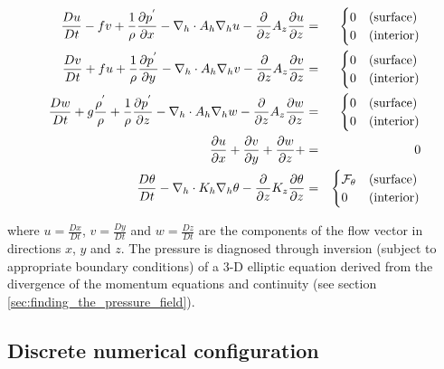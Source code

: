 \begin{eqnarray}
\label{EQ:eg-bconv-model_equations}
\frac{Du}{Dt} - fv + 
  \frac{1}{\rho}\frac{\partial p^{'}}{\partial x} - 
  \nabla_{h}\cdot A_{h}\nabla_{h}u - 
  \frac{\partial}{\partial z}A_{z}\frac{\partial u}{\partial z} 
 & = &
\begin{cases}
0 & \text{(surface)} \\
0 & \text{(interior)}
\end{cases}
\\
\frac{Dv}{Dt} + fu + 
  \frac{1}{\rho}\frac{\partial p^{'}}{\partial y} - 
  \nabla_{h}\cdot A_{h}\nabla_{h}v - 
  \frac{\partial}{\partial z}A_{z}\frac{\partial v}{\partial z} 
& = &
\begin{cases}
0 & \text{(surface)} \\
0 & \text{(interior)}
\end{cases}
\\
\frac{Dw}{Dt} + g \frac{\rho^{'}}{\rho} + 
  \frac{1}{\rho}\frac{\partial p^{'}}{\partial z} - 
  \nabla_{h}\cdot A_{h}\nabla_{h}w - 
  \frac{\partial}{\partial z}A_{z}\frac{\partial w}{\partial z} 
& = &
\begin{cases}
0 & \text{(surface)} \\
0 & \text{(interior)}
\end{cases}
\\
\frac{\partial u}{\partial x} + 
\frac{\partial v}{\partial y} + 
\frac{\partial w}{\partial z} + 
&=&
0
\\
\frac{D\theta}{Dt} -
 \nabla_{h}\cdot K_{h}\nabla_{h}\theta
 - \frac{\partial}{\partial z}K_{z}\frac{\partial\theta}{\partial z} 
& = &
\begin{cases}
{\cal F}_\theta & \text{(surface)} \\
0 & \text{(interior)}
\end{cases}
\end{eqnarray}

\noindent where $u=\frac{Dx}{Dt}$, $v=\frac{Dy}{Dt}$  and 
$w=\frac{Dz}{Dt}$ are the components of the
flow vector in directions $x$, $y$ and $z$. 
The pressure is diagnosed through inversion (subject to appropriate boundary
conditions) of a 3-D elliptic equation derived from the divergence of the momentum 
equations and continuity (see section \ref{sec:finding_the_pressure_field}).
\\

\subsection{Discrete numerical configuration}
\label{www:tutorials}

